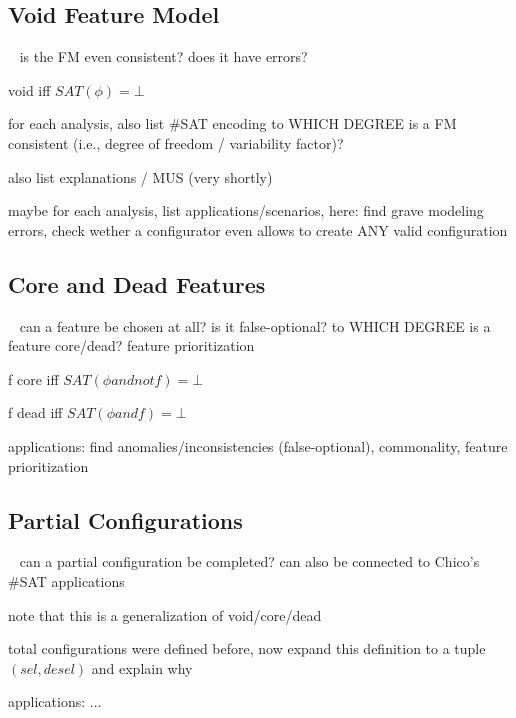 \subsection{Void Feature Model}
\begin{frame}{~}
    is the FM even consistent? does it have errors? %

    void iff $SAT(\phi) = \bot$

    for each analysis, also list \#SAT encoding
    to WHICH DEGREE is a FM consistent (i.e., degree of freedom / variability factor)?

    also list explanations / MUS (very shortly)

    maybe for each analysis, list applications/scenarios, here: find grave modeling errors, check wether a configurator even allows to create ANY valid configuration
\end{frame}

\subsection{Core and Dead Features}
\begin{frame}{~}
    can a feature be chosen at all? is it false-optional?
    to WHICH DEGREE is a feature core/dead? feature prioritization
   
    f core iff $SAT(\phi and not f) = \bot$
    
    f dead iff $SAT(\phi and f) = \bot$

    applications: find anomalies/inconsistencies (false-optional), commonality, feature prioritization
\end{frame}

\subsection{Partial Configurations}
\begin{frame}{~}
    can a partial configuration be completed?
    can also be connected to Chico's \#SAT applications

    note that this is a generalization of void/core/dead

    total configurations were defined before, now expand this definition to a tuple $(sel, desel)$ and explain why

    applications: ...
\end{frame}

